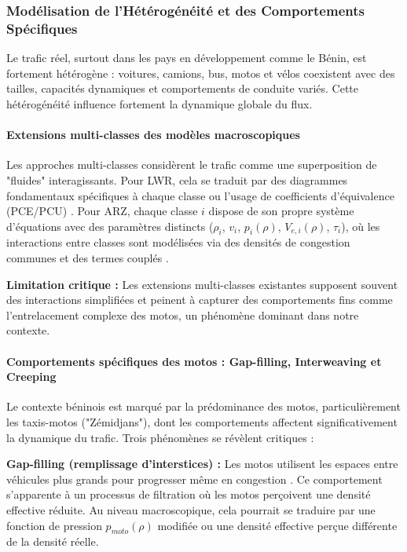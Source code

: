 \subsubsection{Modélisation de l'Hétérogénéité et des Comportements Spécifiques}
Le trafic réel, surtout dans les pays en développement comme le Bénin, est fortement hétérogène : voitures, camions, bus, motos et vélos coexistent avec des tailles, capacités dynamiques et comportements de conduite variés. Cette hétérogénéité influence fortement la dynamique globale du flux.

\paragraph{Extensions multi-classes des modèles macroscopiques}
Les approches multi-classes considèrent le trafic comme une superposition de "fluides" interagissants. Pour LWR, cela se traduit par des diagrammes fondamentaux spécifiques à chaque classe ou l'usage de coefficients d'équivalence (PCE/PCU) \cite{RambhaN/ACE269Lec12}. Pour ARZ, chaque classe $i$ dispose de son propre système d'équations avec des paramètres distincts ($\rho_i$, $v_i$, $p_i(\rho)$, $V_{e,i}(\rho)$, $\tau_i$), où les interactions entre classes sont modélisées via des densités de congestion communes et des termes couplés \cite{FanWork2015, ColomboMarcellini2020}.

\textbf{Limitation critique :} Les extensions multi-classes existantes supposent souvent des interactions simplifiées et peinent à capturer des comportements fins comme l'entrelacement complexe des motos, un phénomène dominant dans notre contexte.

\paragraph{Comportements spécifiques des motos : Gap-filling, Interweaving et Creeping}
Le contexte béninois est marqué par la prédominance des motos, particulièrement les taxis-motos ("Zémidjans"), dont les comportements affectent significativement la dynamique du trafic. Trois phénomènes se révèlent critiques :

\textbf{Gap-filling (remplissage d'interstices) :} Les motos utilisent les espaces entre véhicules plus grands pour progresser même en congestion \cite{khan2021macroscopic, NguyenEtAl2012}. Ce comportement s'apparente à un processus de filtration où les motos perçoivent une densité effective réduite. Au niveau macroscopique, cela pourrait se traduire par une fonction de pression $p_{moto}(\rho)$ modifiée ou une densité effective perçue différente de la densité réelle.


